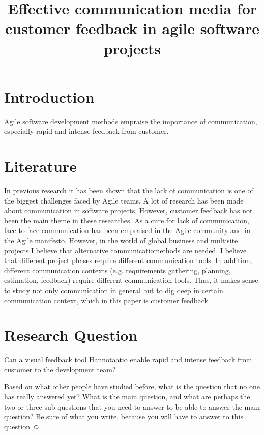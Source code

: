 \documentclass[a4paper]{article}
\begin{document}
\title{\huge Effective communication media for customer feedback in agile software projects}
\date{\vspace{-5ex}}
\maketitle

\section{Introduction}
Agile software development methods empraise the importance of communication, especially rapid and intense feedback from customer.

\section{Literature}
In previous research it has been shown that the lack of communication is one of the biggest challenges faced by Agile teams. A lot of research has been made about communication in software projects. However, customer feedback has not been the main theme in these researches.
As a cure for lack of communication, face-to-face communication has been empraised in the Agile community and in the Agile manifesto. However, in the world of global business and multisite projects I believe that alternative communicatiomethods are needed.
I believe that different project phases require different communication tools. In addition, different communication contexts (e.g. requirements gathering, planning, estimation, feedback) require different communication tools. Thus, it makes sense to study not only communication in general but to dig deep in certain communication context, which in this paper is customer feedback.

\section{Research Question}

Can a visual feedback tool Hannotaatio enable rapid and intense feedback from customer to the development team?

Based on what other people have studied before, what is the question that no one has really answered yet? What is the main question, and what are perhaps the two or three sub-questions that you need to answer to be able to answer the main question? Be sure of what you write, because you will have to answer to this question ☺
\end{document}

